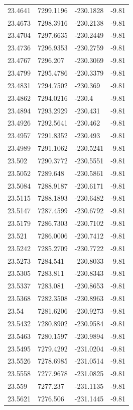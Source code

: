 \begin{table}[H]
\begin{tabular}{llll}
23.4641 & 7299.1196 & -230.1828 & -9.81 \\
23.4673 & 7298.3916 & -230.2138 & -9.81 \\
23.4704 & 7297.6635 & -230.2449 & -9.81 \\
23.4736 & 7296.9353 & -230.2759 & -9.81 \\
23.4767 & 7296.207 & -230.3069 & -9.81 \\
23.4799 & 7295.4786 & -230.3379 & -9.81 \\
23.4831 & 7294.7502 & -230.369 & -9.81 \\
23.4862 & 7294.0216 & -230.4 & -9.81 \\
23.4894 & 7293.2929 & -230.431 & -9.81 \\
23.4926 & 7292.5641 & -230.462 & -9.81 \\
23.4957 & 7291.8352 & -230.493 & -9.81 \\
23.4989 & 7291.1062 & -230.5241 & -9.81 \\
23.502 & 7290.3772 & -230.5551 & -9.81 \\
23.5052 & 7289.648 & -230.5861 & -9.81 \\
23.5084 & 7288.9187 & -230.6171 & -9.81 \\
23.5115 & 7288.1893 & -230.6482 & -9.81 \\
23.5147 & 7287.4599 & -230.6792 & -9.81 \\
23.5179 & 7286.7303 & -230.7102 & -9.81 \\
23.521 & 7286.0006 & -230.7412 & -9.81 \\
23.5242 & 7285.2709 & -230.7722 & -9.81 \\
23.5273 & 7284.541 & -230.8033 & -9.81 \\
23.5305 & 7283.811 & -230.8343 & -9.81 \\
23.5337 & 7283.081 & -230.8653 & -9.81 \\
23.5368 & 7282.3508 & -230.8963 & -9.81 \\
23.54 & 7281.6206 & -230.9273 & -9.81 \\
23.5432 & 7280.8902 & -230.9584 & -9.81 \\
23.5463 & 7280.1597 & -230.9894 & -9.81 \\
23.5495 & 7279.4292 & -231.0204 & -9.81 \\
23.5526 & 7278.6985 & -231.0514 & -9.81 \\
23.5558 & 7277.9678 & -231.0825 & -9.81 \\
23.559 & 7277.237 & -231.1135 & -9.81 \\
23.5621 & 7276.506 & -231.1445 & -9.81 \\

\end{tabular}
\end{table}
